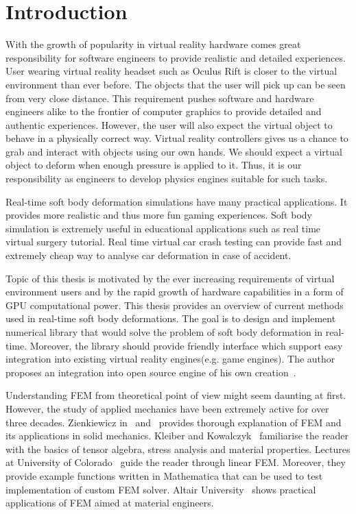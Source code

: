 \documentclass[en]{minipw} %
\begin{document}
\makestatement


\cleardoublepage
\tableofcontents


\cleardoublepage
\pagestyle{fancy}

\chapter*{Introduction}
With the growth of popularity in virtual reality hardware comes great responsibility for software engineers to provide realistic and detailed experiences. User wearing virtual reality headset such as Oculus Rift is closer to the virtual environment than ever before. The objects that the user will pick up can be seen from very close distance. This requirement pushes software and hardware engineers alike to the frontier of computer graphics to provide detailed and authentic experiences. However, the user will also expect the virtual object to behave in a physically correct way. Virtual reality controllers gives us a chance to grab and interact with objects using our own hands. We should expect a virtual object to deform when enough pressure is applied to it. Thus, it is our responsibility as engineers to develop physics engines suitable for such tasks.

Real-time soft body deformation simulations have many practical applications. It provides more realistic and thus more fun gaming experiences. Soft body simulation is extremely useful in educational applications such as real time virtual surgery tutorial. Real time virtual car crash testing can provide fast and extremely cheap way to analyse car deformation in case of accident.

Topic of this thesis is motivated by the ever increasing requirements of virtual environment users and by the rapid growth of hardware capabilities in a form of GPU computational power. This thesis provides an overview of current methods used in real-time soft body deformations. The goal is to design and implement numerical library that would solve the problem of soft body deformation in real-time. Moreover, the library should provide friendly interface which support easy integration into existing virtual reality engines(e.g. game engines). The author proposes an integration into open source engine of his own creation~\cite{ifx}.

Understanding FEM from theoretical point of view might seem daunting at first. However, the study of applied mechanics have been extremely active for over three decades. Zienkiewicz in~\cite{zienkiewicz1} and~\cite{zienkiewicz2} provides thorough explanation of FEM and its applications in solid mechanics. Kleiber and Kowalczyk~\cite{termo} familiarise the reader with the basics of tensor algebra, stress analysis and material properties. Lectures at University of Colorado~\cite{colorado_fem_lectures} guide the reader through linear FEM. Moreover, they provide example functions written in Mathematica that can be used to test implementation of custom FEM solver. Altair University~\cite{altair} shows practical applications of FEM aimed at material engineers.
\end{document}
